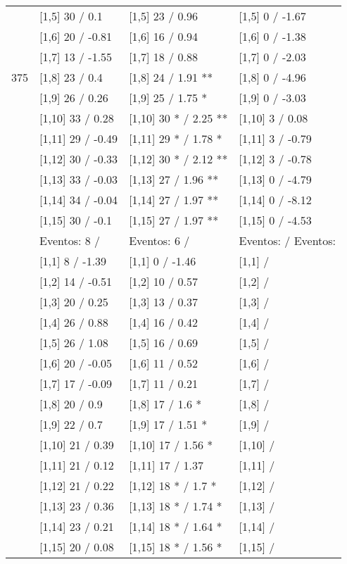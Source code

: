 \begin{table}
\begin{tabular}[t]{llll}
 & {}[1,5] 30  / 0.1 & {}[1,5] 23  / 0.96 & {}[1,5] 0  / -1.67\\
 & {}[1,6] 20  / -0.81 & {}[1,6] 16  / 0.94 & {}[1,6] 0  / -1.38\\
 & {}[1,7] 13  / -1.55 & {}[1,7] 18  / 0.88 & {}[1,7] 0  / -2.03\\
375 & {}[1,8] 23  / 0.4 & {}[1,8] 24  / 1.91 ** & {}[1,8] 0  / -4.96\\
\addlinespace
 & {}[1,9] 26  / 0.26 & {}[1,9] 25  / 1.75 * & {}[1,9] 0  / -3.03\\
 & {}[1,10] 33  / 0.28 & {}[1,10] 30 * / 2.25 ** & {}[1,10] 3  / 0.08\\
 & {}[1,11] 29  / -0.49 & {}[1,11] 29 * / 1.78 * & {}[1,11] 3  / -0.79\\
 & {}[1,12] 30  / -0.33 & {}[1,12] 30 * / 2.12 ** & {}[1,12] 3  / -0.78\\
 & {}[1,13] 33  / -0.03 & {}[1,13] 27  / 1.96 ** & {}[1,13] 0  / -4.79\\
\addlinespace
 & {}[1,14] 34  / -0.04 & {}[1,14] 27  / 1.97 ** & {}[1,14] 0  / -8.12\\
 & {}[1,15] 30  / -0.1 & {}[1,15] 27  / 1.97 ** & {}[1,15] 0  / -4.53\\
 & Eventos:  8 / & Eventos:  6 / & Eventos:   / Eventos:\\
 & {}[1,1] 8  / -1.39 & {}[1,1] 0  / -1.46 & {}[1,1]  /\\
 & {}[1,2] 14  / -0.51 & {}[1,2] 10  / 0.57 & {}[1,2]  /\\
\addlinespace
 & {}[1,3] 20  / 0.25 & {}[1,3] 13  / 0.37 & {}[1,3]  /\\
 & {}[1,4] 26  / 0.88 & {}[1,4] 16  / 0.42 & {}[1,4]  /\\
 & {}[1,5] 26  / 1.08 & {}[1,5] 16  / 0.69 & {}[1,5]  /\\
 & {}[1,6] 20  / -0.05 & {}[1,6] 11  / 0.52 & {}[1,6]  /\\
 & {}[1,7] 17  / -0.09 & {}[1,7] 11  / 0.21 & {}[1,7]  /\\
\addlinespace
500 & {}[1,8] 20  / 0.9 & {}[1,8] 17  / 1.6 * & {}[1,8]  /\\
 & {}[1,9] 22  / 0.7 & {}[1,9] 17  / 1.51 * & {}[1,9]  /\\
 & {}[1,10] 21  / 0.39 & {}[1,10] 17  / 1.56 * & {}[1,10]  /\\
 & {}[1,11] 21  / 0.12 & {}[1,11] 17  / 1.37 & {}[1,11]  /\\
 & {}[1,12] 21  / 0.22 & {}[1,12] 18 * / 1.7 * & {}[1,12]  /\\
\addlinespace
 & {}[1,13] 23  / 0.36 & {}[1,13] 18 * / 1.74 * & {}[1,13]  /\\
 & {}[1,14] 23  / 0.21 & {}[1,14] 18 * / 1.64 * & {}[1,14]  /\\
 & {}[1,15] 20  / 0.08 & {}[1,15] 18 * / 1.56 * & {}[1,15]  /\\
\bottomrule
\end{tabular}
\end{table}
